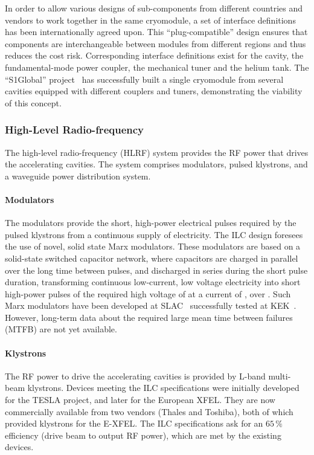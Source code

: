 In order to allow various designs of sub-components from different countries and vendors to work together in the same cryomodule, a set of interface definitions has been internationally agreed upon.
This ``plug-compatible'' design ensures that components are interchangeable between modules from different regions and thus reduces the cost risk.
Corresponding interface definitions exist for the cavity, the fundamental-mode power coupler, the mechanical tuner and the helium tank.
The ``S1Global'' project~\cite{bib:s1g} has successfully built a single cryomodule from several cavities equipped with different couplers and tuners, demonstrating the viability of this concept.


\subsubsection{High-Level Radio-frequency}

The high-level radio-frequency (HLRF) system provides the RF power that drives the accelerating cavities.
The system comprises modulators, pulsed klystrons, and a waveguide power distribution system.


\paragraph{Modulators}
The modulators provide the short, high-power electrical pulses required by the pulsed klystrons from a continuous supply of electricity. 
The ILC design foresees the use of novel, solid state Marx modulators.
These modulators are based on a solid-state switched capacitor network, where capacitors are charged in parallel over the long time between pulses, and discharged in series during the short pulse duration,
transforming continuous low-current, low voltage electricity into short high-power pulses of the required high voltage of  at a current of , over .
Such Marx modulators have been developed at SLAC~\cite{Kemp:2011zz} successfully tested at KEK~\cite{Gaudreau:2014pza}.
However, long-term data about the required large mean time between failures (MTFB) are not yet available.

\paragraph{Klystrons}
The RF power to drive the accelerating cavities is provided by  L-band multi-beam klystrons. 
Devices meeting the ILC specifications were initially developed for the TESLA project, and later for the European XFEL.
They are now commercially available from two vendors (Thales and Toshiba), both of which provided klystrons for the E-XFEL.
The ILC specifications ask for an $65\,\%$ efficiency (drive beam to output RF power), which are met by the existing devices.

